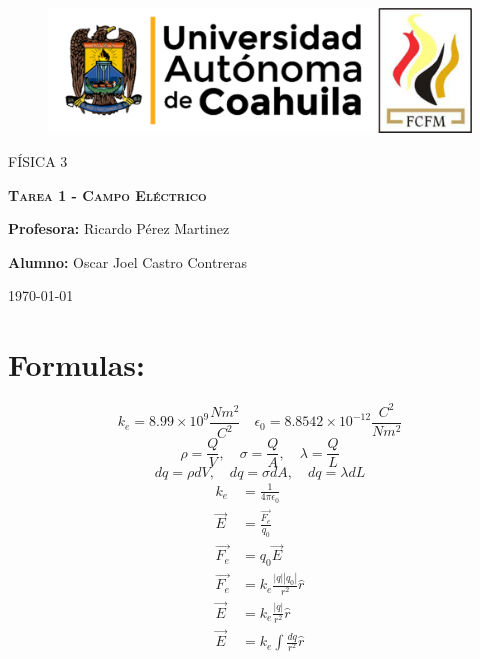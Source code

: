 \documentclass[12pt]{article}
\begin{document}
		
		\begin{titlepage}
		
			\centering
			{\bfseries
			\begin{figure}[h!]
				\centering
				\includegraphics[width=\linewidth]{Nom_UAdeC_FCFM.png} 				
			\end{figure}
			\par}
			\vspace{2cm}
			{\scshape\LARGE FÍSICA 3 \par}
			\vspace{3cm}
			{\scshape\Huge \textbf{Tarea 1 - Campo Eléctrico} \par}
			\vfill
			{\LARGE \textbf{Profesora:} Ricardo Pérez Martinez \par}
			\vspace{3cm}
			{\LARGE \textbf{Alumno:} Oscar Joel Castro Contreras \par}
			\vfill
			{\Large \today \par}
			\thispagestyle{empty}
			
		\end{titlepage}
	
		\newpage
		
		\tableofcontents		
		
		\newpage
		
		\section*{Formulas:}\label{sec:Formulas}
			$$ k_e = 8.99 \times 10^9 \frac{Nm^2}{C^2} \quad \epsilon_0 = 8.8542 \times 10^{-12} \frac{C^2}{Nm^2} $$
			$$ \rho = \frac{Q}{V}, \quad \sigma = \frac{Q}{A}, \quad \lambda = \frac{Q}{L} $$
			$$ dq = \rho dV, \quad dq = \sigma dA, \quad dq = \lambda dL $$
			\begin{align}
				k_e &= \frac{1}{4\pi\epsilon_0} \nonumber \\
				\vec{E} &= \frac{\vec{F_e}}{q_0} \\
				\vec{F_e} &= q_0 \vec{E} \\
				\vec{F_e} &= k_e \frac{|q||q_0|}{r^2} \hat{r} \\
				\vec{E} &= k_e \frac{|q|}{r^2} \hat{r} \\
				\vec{E} &= k_e \int \frac{dq}{r^2} \hat{r}
			\end{align}
\end{document}
